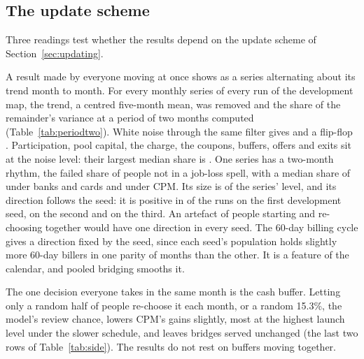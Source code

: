 \begin{table}[htbp]\centering\small
\resizebox{\linewidth}{!}{}
\caption{Outside rates below the grid's, beside the base at 4.4\%, by launch participation: the holding charge at
a launch of 20\%, CPM's gains in dollars a person a year with no distress, and payments that fail at 2 points of
distress under CPM and under banks and cards. Exploratory, \ExploreSeeds{} seeds.}
\label{tab:lowrates}
\end{table}

\subsection{The update scheme}

Three readings test whether the results depend on the update scheme of Section~\ref{sec:updating}.

A result made by everyone moving at once shows as a series alternating about its trend month to month. For
every monthly series of every run of the development map, the trend, a centred five-month mean, was removed and the share of the
remainder's variance at a period of two months computed (Table~\ref{tab:periodtwo}). White noise through the same
filter gives \PeriodTwoWhiteNoise{} and a flip-flop \PeriodTwoFlipFlop{}. Participation, pool capital, the charge,
the coupons, buffers, offers and exits sit at the noise level: their largest median share is
\PeriodTwoOthersMost{}. One series has a two-month rhythm, the failed share of people not in a job-loss spell, with
a median share of \PeriodTwoBanks{} under banks and cards and \PeriodTwoCpm{} under CPM. Its size is
\PeriodTwoAmplitude{} of the series' level, and its direction follows the seed: it is positive in
\PeriodTwoSignFirstSeed{} of the runs on the first development seed, \PeriodTwoSignSecondSeed{} on the second and
\PeriodTwoSignThirdSeed{} on the third. An artefact of people starting and re-choosing together would have one
direction in every seed. The 60-day billing cycle gives a direction fixed by the seed, since each seed's
population holds slightly more 60-day billers in one parity of months than the other. It is a feature of the
calendar, and pooled bridging smooths it.

The one decision everyone takes in the same month is the cash buffer. Letting only a random half of people
re-choose it each month, or a random 15.3\%, the model's review chance, lowers CPM's gains slightly, most at the
highest launch level under the slower schedule, and leaves bridges served unchanged (the last two rows of
Table~\ref{tab:side}). The results do not rest on buffers moving together.

